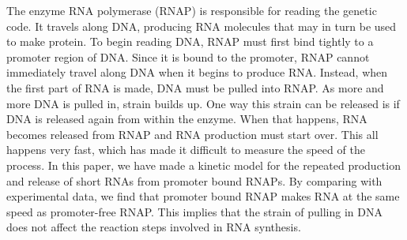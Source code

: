The enzyme RNA polymerase (RNAP) is responsible for reading the genetic code.
It travels along DNA, producing RNA molecules that may in turn be used to make
protein. To begin reading DNA, RNAP must first bind tightly to a promoter
region of DNA. Since it is bound to the promoter, RNAP cannot immediately
travel along DNA when it begins to produce RNA. Instead, when the first part
of RNA is made, DNA must be pulled into RNAP. As more and more DNA is pulled
in, strain builds up. One way this strain can be released is if DNA is
released again from within the enzyme. When that happens, RNA becomes released
from RNAP and RNA production must start over. This all happens very fast,
which has made it difficult to measure the speed of the process. In this
paper, we have made a kinetic model for the repeated production and release of
short RNAs from promoter bound RNAPs. By comparing with experimental data, we
find that promoter bound RNAP makes RNA at the same speed as promoter-free
RNAP. This implies that the strain of pulling in DNA does not affect the
reaction steps involved in RNA synthesis.

